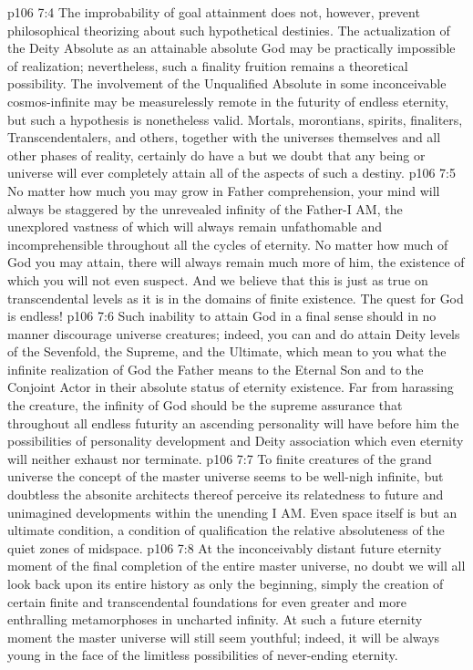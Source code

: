\vs p106 7:4 The improbability of goal attainment does not, however, prevent philosophical theorizing about such hypothetical destinies. The actualization of the Deity Absolute as an attainable absolute God may be practically impossible of realization; nevertheless, such a finality fruition remains a theoretical possibility. The involvement of the Unqualified Absolute in some inconceivable cosmos\hyp{}infinite may be measurelessly remote in the futurity of endless eternity, but such a hypothesis is nonetheless valid. Mortals, morontians, spirits, finaliters, Transcendentalers, and others, together with the universes themselves and all other phases of reality, certainly do have a  but we doubt that any being or universe will ever completely attain all of the aspects of such a destiny.
\pc \vs p106 7:5 No matter how much you may grow in Father comprehension, your mind will always be staggered by the unrevealed infinity of the Father\hyp{}I AM, the unexplored vastness of which will always remain unfathomable and incomprehensible throughout all the cycles of eternity. No matter how much of God you may attain, there will always remain much more of him, the existence of which you will not even suspect. And we believe that this is just as true on transcendental levels as it is in the domains of finite existence. The quest for God is endless!
\vs p106 7:6 Such inability to attain God in a final sense should in no manner discourage universe creatures; indeed, you can and do attain Deity levels of the Sevenfold, the Supreme, and the Ultimate, which mean to you what the infinite realization of God the Father means to the Eternal Son and to the Conjoint Actor in their absolute status of eternity existence. Far from harassing the creature, the infinity of God should be the supreme assurance that throughout all endless futurity an ascending personality will have before him the possibilities of personality development and Deity association which even eternity will neither exhaust nor terminate.
\pc \vs p106 7:7 To finite creatures of the grand universe the concept of the master universe seems to be well\hyp{}nigh infinite, but doubtless the absonite architects thereof perceive its relatedness to future and unimagined developments within the unending I AM. Even space itself is but an ultimate condition, a condition of qualification  the relative absoluteness of the quiet zones of midspace.
\vs p106 7:8 At the inconceivably distant future eternity moment of the final completion of the entire master universe, no doubt we will all look back upon its entire history as only the beginning, simply the creation of certain finite and transcendental foundations for even greater and more enthralling metamorphoses in uncharted infinity. At such a future eternity moment the master universe will still seem youthful; indeed, it will be always young in the face of the limitless possibilities of never\hyp{}ending eternity.
